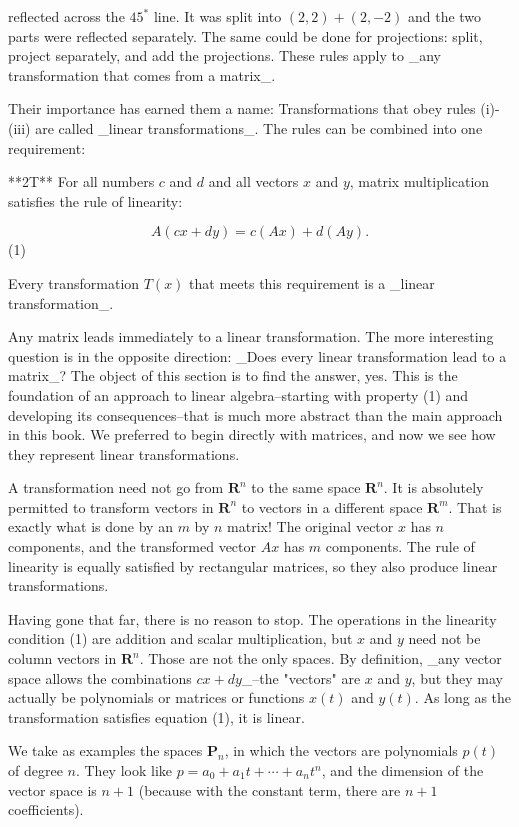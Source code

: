 reflected across the \(45^{*}\) line. It was split into \((2,2)+(2,-2)\) and the two parts were reflected separately. The same could be done for projections: split, project separately, and add the projections. These rules apply to _any transformation that comes from a matrix_.

Their importance has earned them a name: Transformations that obey rules (i)-(iii) are called _linear transformations_. The rules can be combined into one requirement:

**2T** For all numbers \(c\) and \(d\) and all vectors \(x\) and \(y\), matrix multiplication satisfies the rule of linearity:

\[A(cx+dy)=c(Ax)+d(Ay).\] (1)

Every transformation \(T(x)\) that meets this requirement is a _linear transformation_.

Any matrix leads immediately to a linear transformation. The more interesting question is in the opposite direction: _Does every linear transformation lead to a matrix_? The object of this section is to find the answer, yes. This is the foundation of an approach to linear algebra--starting with property (1) and developing its consequences--that is much more abstract than the main approach in this book. We preferred to begin directly with matrices, and now we see how they represent linear transformations.

A transformation need not go from \(\mathbf{R}^{n}\) to the same space \(\mathbf{R}^{n}\). It is absolutely permitted to transform vectors in \(\mathbf{R}^{n}\) to vectors in a different space \(\mathbf{R}^{m}\). That is exactly what is done by an \(m\) by \(n\) matrix! The original vector \(x\) has \(n\) components, and the transformed vector \(Ax\) has \(m\) components. The rule of linearity is equally satisfied by rectangular matrices, so they also produce linear transformations.

Having gone that far, there is no reason to stop. The operations in the linearity condition (1) are addition and scalar multiplication, but \(x\) and \(y\) need not be column vectors in \(\mathbf{R}^{n}\). Those are not the only spaces. By definition, _any vector space allows the combinations \(cx+dy\)_--the "vectors" are \(x\) and \(y\), but they may actually be polynomials or matrices or functions \(x(t)\) and \(y(t)\). As long as the transformation satisfies equation (1), it is linear.

We take as examples the spaces \(\mathbf{P}_{n}\), in which the vectors are polynomials \(p(t)\) of degree \(n\). They look like \(p=a_{0}+a_{1}t+\cdots+a_{n}t^{n}\), and the dimension of the vector space is \(n+1\) (because with the constant term, there are \(n+1\) coefficients).

